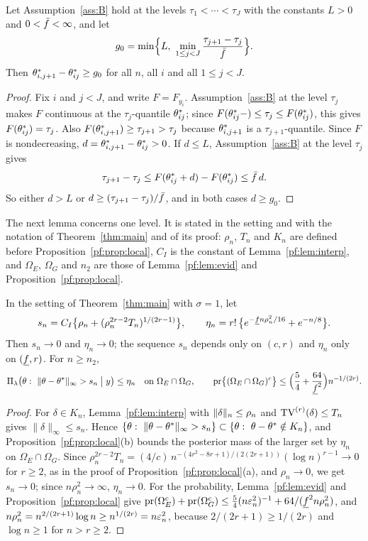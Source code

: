 \begin{lemma}[separation]\label{pf:lem:gap}
Let Assumption~\ref{ass:B} hold at the levels $\tau_1<\cdots<\tau_J$ with the constants $L>0$ and $0<\bar f<\infty$, and let
\[
g_0=\min\Bigl\{L,\ \min_{1\le j<J}\frac{\tau_{j+1}-\tau_j}{\bar f}\Bigr\}.
\]
Then $\theta^{*}_{i,j+1}-\theta^{*}_{ij}\ge g_0$ for all $n$, all $i$ and all $1\le j<J$.
\end{lemma}

\begin{proof}
Fix $i$ and $j<J$, and write $F=F_{y_i}$. Assumption~\ref{ass:B} at the level $\tau_j$ makes $F$ continuous at the $\tau_j$-quantile $\theta^{*}_{ij}$; since $F(\theta^{*}_{ij}-)\le\tau_j\le F(\theta^{*}_{ij})$, this gives $F(\theta^{*}_{ij})=\tau_j$. Also $F(\theta^{*}_{i,j+1})\ge\tau_{j+1}>\tau_j$ because $\theta^{*}_{i,j+1}$ is a $\tau_{j+1}$-quantile. Since $F$ is nondecreasing, $d=\theta^{*}_{i,j+1}-\theta^{*}_{ij}>0$. If $d\le L$, Assumption~\ref{ass:B} at the level $\tau_j$ gives
\[
\tau_{j+1}-\tau_j\le F(\theta^{*}_{ij}+d)-F(\theta^{*}_{ij})\le\bar f\,d .
\]
So either $d>L$ or $d\ge(\tau_{j+1}-\tau_j)/\bar f$, and in both cases $d\ge g_0$.
\end{proof}

The next lemma concerns one level. It is stated in the setting and with the notation of Theorem~\ref{thm:main} and of its proof: $\rho_n$, $T_n$ and $K_n$ are defined before Proposition~\ref{pf:prop:local}, $C_I$ is the constant of Lemma~\ref{pf:lem:interp}, and $\Omega_E$, $\Omega_G$ and $n_2$ are those of Lemma~\ref{pf:lem:evid} and Proposition~\ref{pf:prop:local}.

\begin{lemma}\label{pf:lem:sup}
In the setting of Theorem~\ref{thm:main} with $\sigma=1$, let
\[
s_n=C_I\bigl\{\rho_n+(\rho_n^{2r-2}T_n)^{1/(2r-1)}\bigr\},\qquad \eta_n=r!\,\bigl\{e^{-\underline f n\rho_n^2/16}+e^{-n/8}\bigr\}.
\]
Then $s_n\to0$ and $\eta_n\to0$; the sequence $s_n$ depends only on $(c,r)$ and $\eta_n$ only on $(\underline f,r)$. For $n\ge n_2$,
\[
\Pi_\lambda\bigl(\theta:\ \|\theta-\thetas\|_\infty>s_n\bigm|y\bigr)\le\eta_n\quad\text{on }\Omega_E\cap\Omega_G,
\qquad
\pr\bigl\{(\Omega_E\cap\Omega_G)^c\bigr\}\le\Bigl(\frac54+\frac{64}{\fl^2}\Bigr)n^{-1/(2r)} .
\]
\end{lemma}

\begin{proof}
For $\delta\in K_n$, Lemma~\ref{pf:lem:interp} with $\|\delta\|_n\le\rho_n$ and $\mathrm{TV}^{(r)}(\delta)\le T_n$ gives $\|\delta\|_\infty\le s_n$. Hence $\{\theta:\ \|\theta-\thetas\|_\infty>s_n\}\subset\{\theta:\ \theta-\thetas\notin K_n\}$, and Proposition~\ref{pf:prop:local}(b) bounds the posterior mass of the larger set by $\eta_n$ on $\Omega_E\cap\Omega_G$. Since $\rho_n^{2r-2}T_n=(4/c)\,n^{-(4r^2-8r+1)/(2(2r+1))}(\log n)^{r-1}\to0$ for $r\ge2$, as in the proof of Proposition~\ref{pf:prop:local}(a), and $\rho_n\to0$, we get $s_n\to0$; since $n\rho_n^2\to\infty$, $\eta_n\to0$. For the probability, Lemma~\ref{pf:lem:evid} and Proposition~\ref{pf:prop:local} give $\mathrm{pr}(\Omega_E^c)+\mathrm{pr}(\Omega_G^c)\le\tfrac54(n\varepsilon_n^2)^{-1}+64/(\underline f^2n\rho_n^2)$, and $n\rho_n^2=n^{2/(2r+1)}\log n\ge n^{1/(2r)}=n\varepsilon_n^2$, because $2/(2r+1)\ge1/(2r)$ and $\log n\ge1$ for $n>r\ge2$.
\end{proof}


